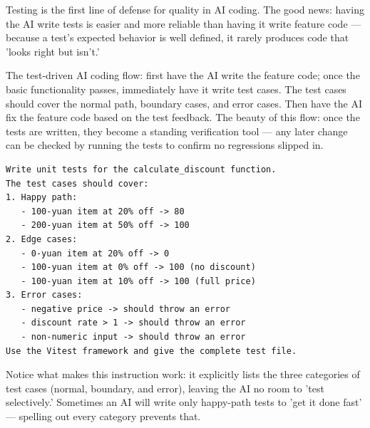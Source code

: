 


Testing is the first line of defense for quality in AI coding. The good news: having the AI write tests is easier and more reliable than having it write feature code — because a test's expected behavior is well defined, it rarely produces code that 'looks right but isn't.'

The test-driven AI coding flow: first have the AI write the feature code; once the basic functionality passes, immediately have it write test cases. The test cases should cover the normal path, boundary cases, and error cases. Then have the AI fix the feature code based on the test feedback. The beauty of this flow: once the tests are written, they become a standing verification tool — any later change can be checked by running the tests to confirm no regressions slipped in.

\begin{lstlisting}
Write unit tests for the calculate_discount function.
The test cases should cover:
1. Happy path:
   - 100-yuan item at 20% off -> 80
   - 200-yuan item at 50% off -> 100
2. Edge cases:
   - 0-yuan item at 20% off -> 0
   - 100-yuan item at 0% off -> 100 (no discount)
   - 100-yuan item at 10% off -> 100 (full price)
3. Error cases:
   - negative price -> should throw an error
   - discount rate > 1 -> should throw an error
   - non-numeric input -> should throw an error
Use the Vitest framework and give the complete test file.
\end{lstlisting}

Notice what makes this instruction work: it explicitly lists the three categories of test cases (normal, boundary, and error), leaving the AI no room to 'test selectively.' Sometimes an AI will write only happy-path tests to 'get it done fast' — spelling out every category prevents that.

